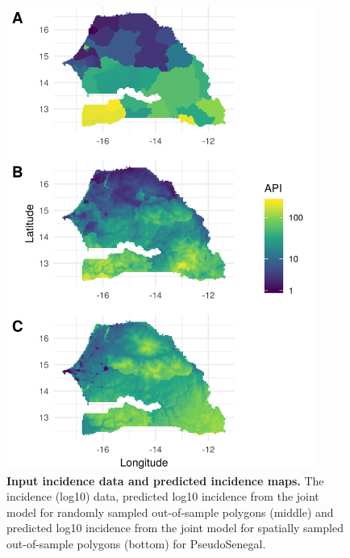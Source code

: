 \documentclass[10pt,letterpaper]{article}
\begin{document}
\begin{figure}[!t]
\includegraphics[width = 0.9\textwidth]{figures/sen_both_cv12_preds.png}
\caption{{\bf Input incidence data and predicted incidence maps. } 
The incidence (log10) data, predicted log10 incidence from the joint model for randomly sampled out-of-sample polygons (middle) and predicted log10 incidence from the joint model for spatially sampled out-of-sample polygons (bottom) for PseudoSenegal.
}
\label{predobsmapsen}
\end{figure}
\end{document}
